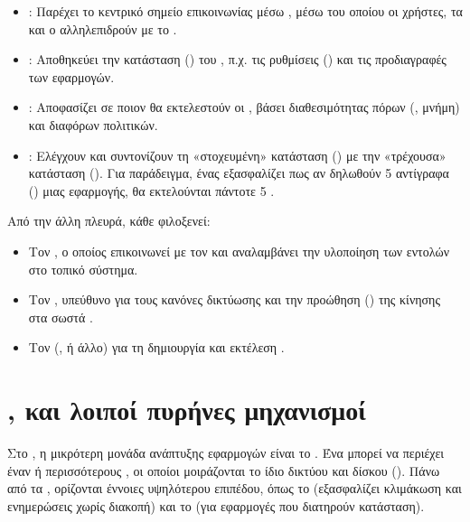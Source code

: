 
\begin{itemize}
    \item \textbf{}: Παρέχει το κεντρικό σημείο επικοινωνίας μέσω  , μέσω του οποίου οι χρήστες, τα  και ο  αλληλεπιδρούν με το  .
    \item \textbf{}: Αποθηκεύει την κατάσταση () του , π.χ. τις ρυθμίσεις () και τις προδιαγραφές των εφαρμογών.
    \item \textbf{}: Αποφασίζει σε ποιον  θα εκτελεστούν οι , βάσει διαθεσιμότητας πόρων (, μνήμη) και διαφόρων πολιτικών.
    \item \textbf{}: Ελέγχουν και συντονίζουν τη «στοχευμένη» κατάσταση () με την «τρέχουσα» κατάσταση (). Για παράδειγμα, ένας  εξασφαλίζει πως αν δηλωθούν 5 αντίγραφα () μιας εφαρμογής, θα εκτελούνται πάντοτε 5 .
\end{itemize}

Από την άλλη πλευρά, κάθε  φιλοξενεί:
\begin{itemize}
    \item Τον \textbf{}, ο οποίος επικοινωνεί με τον  και αναλαμβάνει την υλοποίηση των εντολών στο τοπικό σύστημα.
    \item Τον \textbf{}, υπεύθυνο για τους κανόνες δικτύωσης και την προώθηση () της κίνησης στα σωστά .
    \item Τον \textbf{} (,  ή άλλο) για τη δημιουργία και εκτέλεση .
\end{itemize}

\section{,  και λοιποί πυρήνες μηχανισμοί}

Στο , η μικρότερη μονάδα ανάπτυξης εφαρμογών είναι το . Ένα  μπορεί να περιέχει έναν ή περισσότερους , οι οποίοι μοιράζονται το ίδιο  δικτύου και δίσκου (). Πάνω από τα , ορίζονται έννοιες υψηλότερου επιπέδου, όπως το  (εξασφαλίζει κλιμάκωση και ενημερώσεις χωρίς διακοπή) και το  (για εφαρμογές που διατηρούν κατάσταση). 

